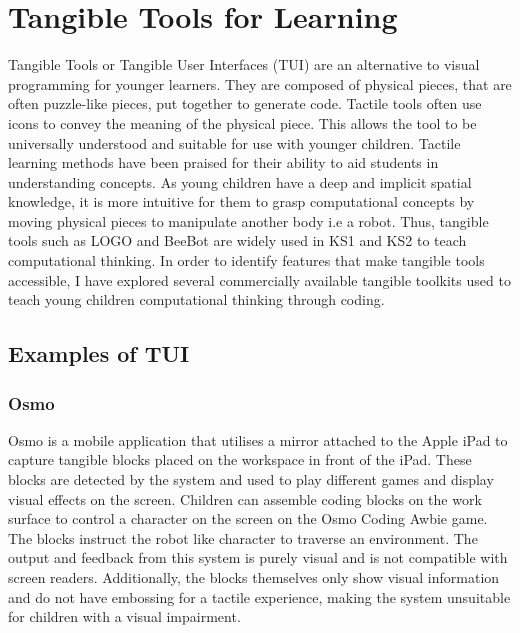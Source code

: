 \documentclass[oneside,%
                    author={Malak Hajji},
                    degree={BSc},
                    title={Designing An Accessible Ozobot Programming Platform for Students},
                  subtitle={With Mixed Visual Abilities}]{dissertation}
\begin{document}
\section{Tangible Tools for Learning}

Tangible Tools or Tangible User Interfaces (TUI) are an alternative to visual programming for younger learners. They are composed of physical pieces, that are often puzzle-like pieces, put together to generate code. Tactile tools often use icons to convey the meaning of the physical piece. This allows the tool to be universally understood and suitable for use with younger children. Tactile learning methods have been praised for their ability to aid students in understanding concepts. As young children have a deep and implicit spatial knowledge, it is more intuitive for them to grasp computational concepts by moving physical pieces to manipulate another body i.e a robot. Thus, tangible tools such as LOGO and BeeBot are widely used in KS1 and KS2 to teach computational thinking\cite{lit-review}.
In order to identify features that make tangible tools accessible, I have explored several commercially available tangible toolkits used to teach young children computational thinking through coding.

\subsection{Examples of TUI}
\subsubsection{Osmo}
Osmo is a mobile application that utilises a mirror attached to the Apple iPad to capture tangible blocks placed on the workspace in front of the iPad. These blocks are detected by the system and used to play different games and display visual effects on the screen. Children can assemble coding blocks on the work surface to control a character on the screen on the Osmo Coding Awbie game. The blocks instruct the robot like character to traverse an environment. The output and feedback from this system is purely visual and is not compatible with screen readers. Additionally, the blocks themselves only show visual information and do not have embossing for a tactile experience, making the system unsuitable for children with a visual impairment.  
\end{document}
